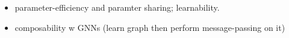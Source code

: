 
\begin{itemize}
    \item parameter-efficiency and paramter sharing; learnability.
    \item composability w GNNs (learn graph then perform message-passing on it)
\end{itemize}